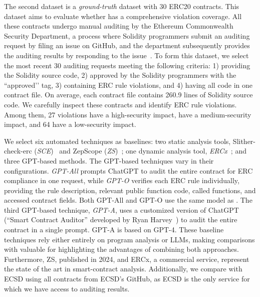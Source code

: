 The second dataset is a \emph{ground-truth} dataset 
with 30 ERC20 contracts. 
This dataset aims to evaluate whether \Tool{} has a 
comprehensive violation coverage.
All these contracts undergo manual auditing by the Ethereum Commonwealth 
Security Department, a process where Solidity programmers submit an auditing 
request by filing an issue on GitHub, 
and the department subsequently provides the auditing results by responding
to the issue~\cite{humanaudited}.
To form this dataset, we select the most recent 30 auditing requests 
meeting the following criteria: 1) providing the Solidity source code, 
2) approved by the Solidity programmers with the ``approved’’ tag, 
3) containing ERC rule violations, 
and 4) having all code in one contract file. 
On average, each contract file contains 260.9 lines of 
Solidity source code. 
We carefully inspect these contracts and 
identify  ERC rule violations.
Among them, 27 violations have a high-security impact, 
 have a medium-security 
impact, and 64 have a low-security impact.



\fi

We select six automated techniques as baselines: 
two static analysis tools, Slither-check-erc (\textit{SCE})~\cite{slither-erc} 
and ZepScope (\textit{ZS})~\cite{ZepScope}; 
one dynamic analysis tool, \textit{ERCx}~\cite{ERCx}; 
and three GPT-based methods. 
The GPT-based techniques vary in their configurations. 
\textit{GPT-All} prompts ChatGPT to audit the entire contract for ERC compliance 
in one request, while \textit{GPT-O} verifies each ERC rule individually, 
providing the rule description, relevant public function code, 
called functions, and accessed contract fields. 
Both GPT-All and GPT-O use the same model as \Tool{}. 
The third GPT-based technique, \textit{GPT-A}, uses a customized version of 
ChatGPT (``Smart Contract Auditor'' developed 
by Ryan Harvey~\cite{GPT-RyanHarvey}) to audit the entire contract 
in a single prompt. GPT-A is based on GPT-4. 
These baseline techniques rely either entirely on program analysis or 
LLMs, making comparisons with \Tool{} valuable for highlighting 
the advantages of combining both approaches. Furthermore,
ZS, published in 2024, and ERCx, a commercial service, 
represent the state of the art in smart-contract analysis. 
Additionally, we compare \Tool{} with 
ECSD using all contracts from ECSD’s GitHub, 
as ECSD is the only service for which we have access to auditing results.

